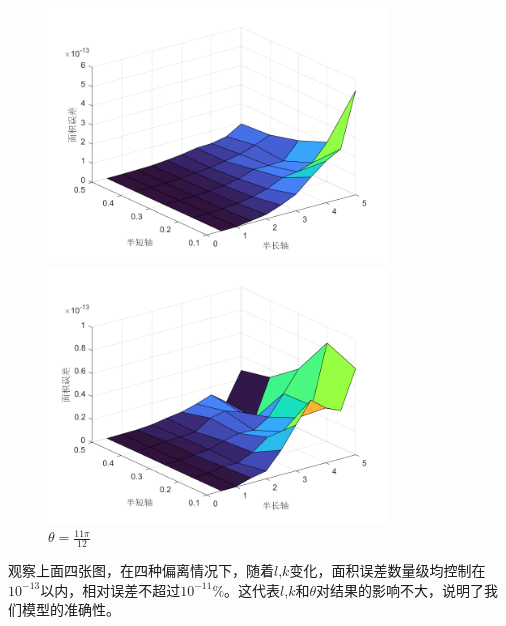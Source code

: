 \documentclass[a4paper,10.5pt]{ctexart}
\begin{document}
\begin{figure}[h]
\centering
\begin{minipage}[t]{0.48\textwidth}
\centering
\includegraphics[width=9cm]{误差2.png}
\caption{$\theta=\frac{3\pi}{4}$}
\end{minipage}
\begin{minipage}[t]{0.48\textwidth}
\centering
\includegraphics[width=9cm]{误差4.png}
\caption{$\theta=\frac{11\pi}{12}$}
\end{minipage}
\end{figure}
\par 观察上面四张图，在四种偏离情况下，随着$l$,$k$变化，面积误差数量级均控制在$10^{-13}$以内，相对误差不超过$10^{-11}\%$。这代表$l$,$k$和$\theta$对结果的影响不大，说明了我们模型的准确性。
\end{document}
